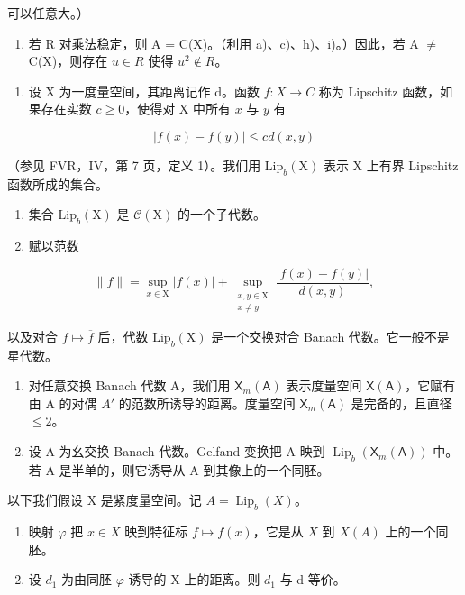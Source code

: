 可以任意大。）

\begin{enumerate}
\def\labelenumi{\alph{enumi})}
\setcounter{enumi}{9}
\tightlist
\item
  若 R 对乘法稳定，则 A = C(X)。（利用 a)、c)、h)、i)。）因此，若 A \(\neq\) C(X)，则存在 \(u \in R\) 使得 \(u^{2} \notin R\)。
\end{enumerate}

\begin{enumerate}
\def\labelenumi{\arabic{enumi})}
\setcounter{enumi}{10}
\tightlist
\item
  设 X 为一度量空间，其距离记作 d。函数 \(f: X \to C\) 称为 Lipschitz 函数，如果存在实数 \(c \geqslant 0\)，使得对 X 中所有 \(x\) 与 \(y\) 有
\end{enumerate}

\[
| f (x) - f (y) | \leqslant c d (x, y)
\]

（参见 FVR，IV，第 7 页，定义 1）。我们用 \(\mathrm{Lip}_b(\mathrm{X})\) 表示 X 上有界 Lipschitz 函数所成的集合。

\begin{enumerate}
\def\labelenumi{\alph{enumi})}
\item
  集合 \(\mathrm{Lip}_b(\mathrm{X})\) 是 \(\mathcal{C}(\mathrm{X})\) 的一个子代数。
\item
  赋以范数
\end{enumerate}

\[
\| f\| = \sup_{x\in \mathrm{X}}|f(x)| + \sup_{\substack{x,y\in \mathrm{X}\\ x\neq y}}\frac{|f(x) - f(y)|}{d(x,y)},
\]

以及对合 \(f \mapsto \overline{f}\) 后，代数 \(\mathrm{Lip}_b(\mathrm{X})\) 是一个交换对合 Banach 代数。它一般不是星代数。

\begin{enumerate}
\def\labelenumi{\alph{enumi})}
\setcounter{enumi}{2}
\item
  对任意交换 Banach 代数 A，我们用 \(\mathsf{X}_{m}(\mathsf{A})\) 表示度量空间 \(\mathsf{X}(\mathsf{A})\)，它赋有由 A 的对偶 \(A'\) 的范数所诱导的距离。度量空间 \(\mathsf{X}_{m}(\mathsf{A})\) 是完备的，且直径 \(\leqslant 2\)。
\item
  设 A 为幺交换 Banach 代数。Gelfand 变换把 A 映到 \(\operatorname{Lip}_{b}(\mathsf{X}_{m}(\mathsf{A}))\) 中。若 A 是半单的，则它诱导从 A 到其像上的一个同胚。
\end{enumerate}

以下我们假设 X 是紧度量空间。记 \(A = \operatorname{Lip}_{b}(X)\)。

\begin{enumerate}
\def\labelenumi{\alph{enumi})}
\setcounter{enumi}{4}
\item
  映射 \(\varphi\) 把 \(x \in X\) 映到特征标 \(f \mapsto f(x)\)，它是从 \(X\) 到 \(X(A)\) 上的一个同胚。
\item
  设 \(d_{1}\) 为由同胚 \(\varphi\) 诱导的 X 上的距离。则 \(d_{1}\) 与 d 等价。
\end{enumerate}

